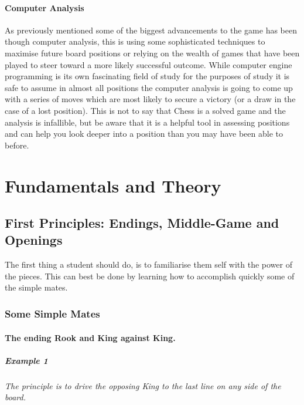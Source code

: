 \documentclass[11pt,a4paper]{book}
\begin{document}
\subsection*{Computer Analysis}

As previously mentioned some of the biggest advancements to the game has been though computer analysis, this is using some sophisticated techniques to maximise future board positions or relying on the wealth of games that have been played to steer toward a more likely successful outcome. While computer engine programming is its own fascinating field of study for the purposes of study it is safe to assume in almost all positions the computer analysis is going to come up with a series of moves which are most likely to secure a victory (or a draw in the case of a lost position). This is not to say that Chess is a solved game and the analysis is infallible, but be aware that it is a helpful tool in assessing positions and can help you look deeper into a position than you may have been able to before.

\part{Fundamentals and Theory}

\chapter{First Principles: Endings, Middle-Game and Openings}

The first thing a student should do, is to familiarise them self with the power of the pieces. This can best be done by learning how to accomplish quickly some of the simple mates.

\section{Some Simple Mates}

\subsection{The ending Rook and King against King.}

\subsubsection*{Example 1}

\emph{The principle is to drive the opposing King to the last line on any side of the board.}
\end{document}
